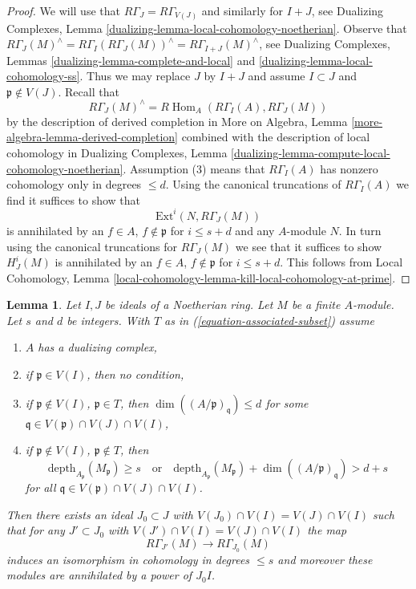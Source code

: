 \documentclass[10pt,a4paper]{amsart}
\theoremstyle{plain}
\newtheorem{lemma}[subsection]{Lemma}
\theoremstyle{definition}
\theoremstyle{remark}
\numberwithin{equation}{subsection}
\def\Hom{\mathop{\mathrm{Hom}}\nolimits}
\begin{document}
\begin{proof}
We will use that $R\Gamma_J = R\Gamma_{V(J)}$ and similarly for
$I + J$, see
Dualizing Complexes, Lemma \ref{dualizing-lemma-local-cohomology-noetherian}.
Observe that
$R\Gamma_J(M)^\wedge = R\Gamma_I(R\Gamma_J(M))^\wedge =
R\Gamma_{I + J}(M)^\wedge$, see
Dualizing Complexes, Lemmas
\ref{dualizing-lemma-complete-and-local} and
\ref{dualizing-lemma-local-cohomology-ss}.
Thus we may replace $J$ by $I + J$ and assume $I \subset J$
and $\mathfrak p \not \in V(J)$.
Recall that
$$
R\Gamma_J(M)^\wedge = R\Hom_A(R\Gamma_I(A), R\Gamma_J(M))
$$
by the description of derived completion in
More on Algebra, Lemma \ref{more-algebra-lemma-derived-completion}
combined with the description of local cohomology in
Dualizing Complexes, Lemma
\ref{dualizing-lemma-compute-local-cohomology-noetherian}.
Assumption (3) means that $R\Gamma_I(A)$ has nonzero cohomology
only in degrees $\leq d$. Using the canonical truncations of
$R\Gamma_I(A)$ we find it suffices to show that
$$
\text{Ext}^i(N, R\Gamma_J(M))
$$
is annihilated by an $f \in A$, $f \not \in \mathfrak p$ for
$i \leq s + d$ and any $A$-module $N$.
In turn using the canonical truncations for $R\Gamma_J(M)$
we see that it suffices to show
$H^i_J(M)$ is annihilated by an $f \in A$, $f \not \in \mathfrak p$
for $i \leq s + d$.
This follows from Local Cohomology, Lemma
\ref{local-cohomology-lemma-kill-local-cohomology-at-prime}.
\end{proof}

\begin{lemma}
\label{lemma-kill-colimit-weak-general}
Let $I, J$ be ideals of a Noetherian ring. Let $M$ be a finite $A$-module.
Let $s$ and $d$ be integers. With $T$ as in
(\ref{equation-associated-subset}) assume
\begin{enumerate}
\item $A$ has a dualizing complex,
\item if $\mathfrak p \in V(I)$, then no condition,
\item if $\mathfrak p \not \in V(I)$, $\mathfrak p \in T$, then
$\dim((A/\mathfrak p)_\mathfrak q) \leq d$ for some
$\mathfrak q \in V(\mathfrak p) \cap V(J) \cap V(I)$,
\item if $\mathfrak p \not \in V(I)$, $\mathfrak p \not \in T$, then
$$
\text{depth}_{A_\mathfrak p}(M_\mathfrak p) \geq s
\quad\text{or}\quad
\text{depth}_{A_\mathfrak p}(M_\mathfrak p) +
\dim((A/\mathfrak p)_\mathfrak q) > d + s
$$
for all $\mathfrak q \in V(\mathfrak p) \cap V(J) \cap V(I)$.
\end{enumerate}
Then there exists an ideal $J_0 \subset J$ with
$V(J_0) \cap V(I) = V(J) \cap V(I)$ such that for any $J' \subset J_0$ with
$V(J') \cap V(I) = V(J) \cap V(I)$ the map
$$
R\Gamma_{J'}(M) \longrightarrow R\Gamma_{J_0}(M)
$$
induces an isomorphism in cohomology in degrees $\leq s$
and moreover these modules are annihilated by a power of $J_0I$.
\end{lemma}
\end{document}
